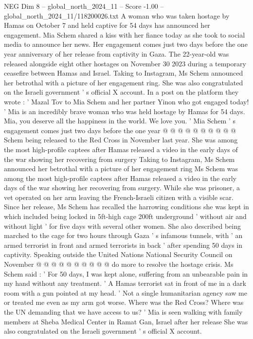 \begin{textsample}{NEG Dim 8 – global\_north\_2024\_11 – Score -1.00 – global\_north\_2024\_11/118200026.txt}  \label{ex:f8_neg_388}
A woman who was taken hostage by Hamas on October 7 and held captive for 54 days has announced her engagement.
Mia Schem shared a kiss with her fiance today as she took to social media to announce her news.
Her engagement comes just two days before the one year anniversary of her release from captivity in Gaza.
The 22-year-old was released alongside eight other hostages on November 30 2023 during a temporary ceasefire between Hamas and Israel.
Taking to Instagram, Ms Schem announced her betrothal with a picture of her engagement ring.
She was also congratulated on the Israeli government ' s official X account.
In a post on the platform they wrote : ' Mazal Tov to Mia Schem and her partner Yinon who got engaged today! ' Mia is an incredibly brave woman who was held hostage by Hamas for 54 days.
Mia, you deserve all the happiness in the world.
We love you. ' Mia Schem ' s engagement comes just two days before the one year @ @ @ @ @ @ @ @ @ @ Schem being released to the Red Cross in November last year.
She was among the most high-profile captees after Hamas released a video in the early days of the war showing her recovering from surgery Taking to Instagram, Ms Schem announced her betrothal with a picture of her engagement ring Ms Schem was among the most high-profile captees after Hamas released a video in the early days of the war showing her recovering from surgery.
While she was prisoner, a vet operated on her arm leaving the French-Israeli citizen with a visible scar.
Since her release, Ms Schem has recalled the harrowing conditions she was kept in which included being locked in 5ft-high cage 200ft underground ' without air and without light ' for five days with several other women.
She also described being marched to the cage for two hours through Gaza ' s infamous tunnels, with ' an armed terrorist in front and armed terrorists in back ' after spending 50 days in captivity.
Speaking outside the United Nations National Security Council on November @ @ @ @ @ @ @ @ @ @ do more to resolve the hostage crisis.
Ms Schem said : ' For 50 days, I was kept alone, suffering from an unbearable pain in my hand without any treatment. ' A Hamas terrorist sat in front of me in a dark room with a gun pointed at my head. ' Not a single humanitarian agency saw me or treated me even as my arm got worse.
Where was the Red Cross?
Where was the UN demanding that we have access to us? ' Mia is seen walking with family members at Sheba Medical Center in Ramat Gan, Israel after her release She was also congratulated on the Israeli government ' s official X account.

\end{textsample}
